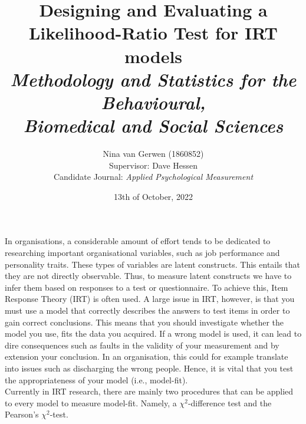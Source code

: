 \documentclass{article}
\title{%
	Designing and Evaluating a Likelihood-Ratio Test for IRT models \\
	\large \textit{Methodology and Statistics for the Behavioural, \\
	Biomedical and Social Sciences}}
\author{Nina van Gerwen (1860852) \\ 
	Supervisor: Dave Hessen \\ 
	\small {Candidate Journal: \textit{Applied Psychological Measurement}}}
\date{13th of October, 2022}
\begin{document}
\maketitle

\newpage

\section{}
\indent In organisations, a considerable amount of effort tends to be dedicated to researching important organisational variables, such as job performance and personality traits. These types of variables are latent constructs. This entails that they are not directly observable. Thus, to measure latent constructs we have to infer them based on responses to a test or questionnaire. To achieve this, Item Response Theory (IRT) is often used. A large issue in IRT, however, is that you must use a model that correctly describes the answers to test items in order to gain correct conclusions. This means that you should investigate whether the model you use, fits the data you acquired. If a wrong model is used, it can lead to dire consequences such as faults in the validity of your measurement \autocite{consq1, consq2, consq3} and by extension your conclusion. In an organisation, this could for example translate into issues such as discharging the wrong people. Hence, it is vital that you test the appropriateness of your model (i.e., model-fit). \\
\indent Currently in IRT research, there are mainly two procedures that can be applied to every model to measure model-fit. Namely, a $\chi^2$-difference test and the Pearson's $\chi^2$-test. 
\end{document}
